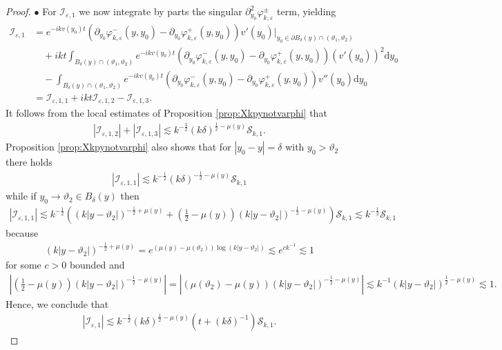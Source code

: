 \documentclass[11pt,reqno]{amsproc}
\newcommand{\bullpar}[1]{\vspace{.5em}\noindent $\bullet$ \normalfont {\bfseries #1.}}
\theoremstyle{definition}
\numberwithin{equation}{section}
\newcommand{\cI}{{\mathcal I}}
\newcommand{\cS}{{\mathcal S}}
\renewcommand{\d}{\mathrm{d}}
\newcommand{\ep}{\varepsilon}
\begin{document}
\begin{proof}
\bullpar{Estimates for $\cI_{\ep,1}$} For $\cI_{\ep,1}$ we now integrate by parts the singular $\partial_{y_0}^2\varphi_{k,\ep}^\pm$ term, yielding
\begin{align*}
\cI_{\ep,1} &= e^{-ikv(y_0)t} \left( \partial_{y_0}\varphi_{k,\ep}^-(y,y_0) - \partial_{y_0}\varphi_{k,\ep}^+(y,y_0) \right) v'(y_0) \Big|_{y_0\in \partial B_\delta(y)\cap (\vartheta_1,\vartheta_2)} \\
& \quad + ikt\int_{B_\delta(y)\cap(\vartheta_1, \vartheta_2)} e^{-ikv(y_0)t} \left( \partial_{y_0}\varphi_{k,\ep}^-(y,y_0) - \partial_{y_0}\varphi_{k,\ep}^+(y,y_0) \right) (v'(y_0))^2 \d y_0 \\
&\quad - \int_{B_\delta(y)\cap(\vartheta_1, \vartheta_2)} e^{-ikv(y_0)t} \left( \partial_{y_0}\varphi_{k,\ep}^-(y,y_0) - \partial_{y_0}\varphi_{k,\ep}^+(y,y_0) \right) v''(y_0) \d y_0 \\
&= \cI_{\ep,1,1} + ikt \cI_{\ep,1,2} - \cI_{\ep,1,3}.
\end{align*}
It follows from the local estimates of Proposition \ref{prop:Xkpynotvarphi} that
\begin{align*}
\left| \cI_{\ep,1,2} \right| + \left| \cI_{\ep,1,3} \right| \lesssim k^{-\frac32}(k\delta)^{\frac12-\mu(y)}\cS_{k,1}.
\end{align*}
Proposition \ref{prop:Xkpynotvarphi} also shows that for $|y_0-y|=\delta$ with $y_0>\vartheta_2$ there holds
\begin{align*}
\left| \cI_{\ep,1,1} \right| \lesssim k^{-\frac12}(k\delta)^{-\frac12-\mu(y)} \cS_{k,1}
\end{align*}
while if $y_0\rightarrow \vartheta_2\in B_\delta(y)$ then
\begin{align*}
\left| \cI_{\ep,1,1}\right| \lesssim k^{-\frac12} \left( (k|y-\vartheta_2|)^{-\frac12+\mu(y)} + (\tfrac12 -\mu(y)) (k|y-\vartheta_2|)^{-\frac12-\mu(y)} \right) \cS_{k,1} \lesssim k^{-\frac12}\cS_{k,1}
\end{align*}
because
\begin{align*}
(k|y-\vartheta_2|)^{-\frac12+\mu(y)} = e^{(\mu(y) - \mu(\vartheta_2))\log(k|y-\vartheta_2|)} \lesssim e^{ck^{-1}} \lesssim 1
\end{align*}
for some $c>0$ bounded and
\begin{align*}
\left| (\tfrac12 -\mu(y)) (k|y-\vartheta_2|)^{-\frac12-\mu(y)} \right| = \left| (\mu(\vartheta_2) -\mu(y)) (k|y-\vartheta_2|)^{-\frac12-\mu(y)} \right| \lesssim k^{-1} (k|y-\vartheta_2|)^{\frac12-\mu(y)}\lesssim 1.
\end{align*}
Hence, we conclude that
\begin{align*}
\left| \cI_{\ep,1} \right| \lesssim k^{-\frac12}(k\delta)^{\frac12-\mu(y)} \left( t + (k\delta)^{-1} \right) \cS_{k,1}.
\end{align*}


\end{proof}
\end{document}
